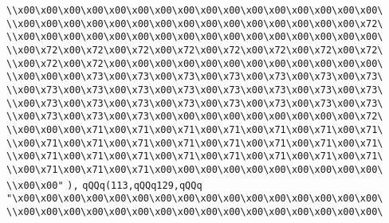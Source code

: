\verb|\\x00\x00\x00\x00\x00\x00\x00\x00\x00\x00\x00\x00\x00\x00\x00\x00\|\newline
\verb|\\x00\x00\x00\x00\x00\x00\x00\x00\x00\x00\x00\x00\x00\x00\x00\x72\|\newline
\verb|\\x00\x00\x00\x00\x00\x00\x00\x00\x00\x00\x00\x00\x00\x00\x00\x00\|\newline
\verb|\\x00\x72\x00\x72\x00\x72\x00\x72\x00\x72\x00\x72\x00\x72\x00\x72\|\newline
\verb|\\x00\x72\x00\x72\x00\x00\x00\x00\x00\x00\x00\x00\x00\x00\x00\x00\|\newline
\verb|\\x00\x00\x00\x73\x00\x73\x00\x73\x00\x73\x00\x73\x00\x73\x00\x73\|\newline
\verb|\\x00\x73\x00\x73\x00\x73\x00\x73\x00\x73\x00\x73\x00\x73\x00\x73\|\newline
\verb|\\x00\x73\x00\x73\x00\x73\x00\x73\x00\x73\x00\x73\x00\x73\x00\x73\|\newline
\verb|\\x00\x73\x00\x73\x00\x73\x00\x00\x00\x00\x00\x00\x00\x00\x00\x72\|\newline
\verb|\\x00\x00\x00\x71\x00\x71\x00\x71\x00\x71\x00\x71\x00\x71\x00\x71\|\newline
\verb|\\x00\x71\x00\x71\x00\x71\x00\x71\x00\x71\x00\x71\x00\x71\x00\x71\|\newline
\verb|\\x00\x71\x00\x71\x00\x71\x00\x71\x00\x71\x00\x71\x00\x71\x00\x71\|\newline
\verb|\\x00\x71\x00\x71\x00\x71\x00\x00\x00\x00\x00\x00\x00\x00\x00\x00\|\newline
\verb|\\x00\x00"|\newline
\verb|),|\newline
\verb|qQQq(113,qQQq129,qQQq|\newline
\verb|"\x00\x00\x00\x00\x00\x00\x00\x00\x00\x00\x00\x00\x00\x00\x00\x00\|\newline
\verb|\\x00\x00\x00\x00\x00\x00\x00\x00\x00\x00\x00\x00\x00\x00\x00\x00\|\newline
